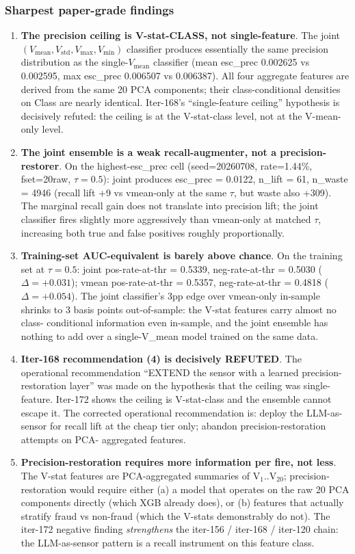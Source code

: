 \subsubsection{Sharpest paper-grade findings}
\begin{enumerate}
\item \textbf{The precision ceiling is V-stat-CLASS, not single-feature}.
The joint $(V_\mathrm{mean}, V_\mathrm{std}, V_\mathrm{max}, V_\mathrm{min})$
classifier produces essentially the same precision distribution as the
single-$V_\mathrm{mean}$ classifier (mean esc\_prec 0.002625 vs
0.002595, max esc\_prec 0.006507 vs 0.006387). All four aggregate
features are derived from the same 20 PCA components; their
class-conditional densities on Class are nearly identical. Iter-168's
``single-feature ceiling'' hypothesis is decisively refuted: the
ceiling is at the V-stat-class level, not at the V-mean-only level.
\item \textbf{The joint ensemble is a weak recall-augmenter, not a
precision-restorer}. On the highest-esc\_prec cell (seed=20260708,
rate=1.44\%, fset=20raw, $\tau = 0.5$): joint produces
esc\_prec = 0.0122, n\_lift = 61, n\_waste = 4946 (recall lift +9 vs
vmean-only at the same $\tau$, but waste also +309). The marginal
recall gain does not translate into precision lift; the joint
classifier fires slightly more aggressively than vmean-only at matched
$\tau$, increasing both true and false positives roughly proportionally.
\item \textbf{Training-set AUC-equivalent is barely above chance}.
On the training set at $\tau = 0.5$: joint pos-rate-at-thr = 0.5339,
neg-rate-at-thr = 0.5030 ($\Delta = +0.031$); vmean pos-rate-at-thr =
0.5357, neg-rate-at-thr = 0.4818 ($\Delta = +0.054$). The joint
classifier's 3pp edge over vmean-only in-sample shrinks to 3 basis
points out-of-sample: the V-stat features carry almost no class-
conditional information even in-sample, and the joint ensemble has
nothing to add over a single-V\_mean model trained on the same data.
\item \textbf{Iter-168 recommendation (4) is decisively REFUTED}. The
operational recommendation ``EXTEND the sensor with a learned
precision-restoration layer'' was made on the hypothesis that the
ceiling was single-feature. Iter-172 shows the ceiling is V-stat-class
and the ensemble cannot escape it. The corrected operational
recommendation is: deploy the LLM-as-sensor for recall lift at the
cheap tier only; abandon precision-restoration attempts on PCA-
aggregated features.
\item \textbf{Precision-restoration requires more information per
fire, not less}. The V-stat features are PCA-aggregated summaries of
V$_1$..V$_{20}$; precision-restoration would require either (a) a model
that operates on the raw 20 PCA components directly (which XGB already
does), or (b) features that actually stratify fraud vs non-fraud (which
the V-stats demonstrably do not). The iter-172 negative finding
\emph{strengthens} the iter-156 / iter-168 / iter-120 chain: the
LLM-as-sensor pattern is a recall instrument on this feature class.
\end{enumerate}

